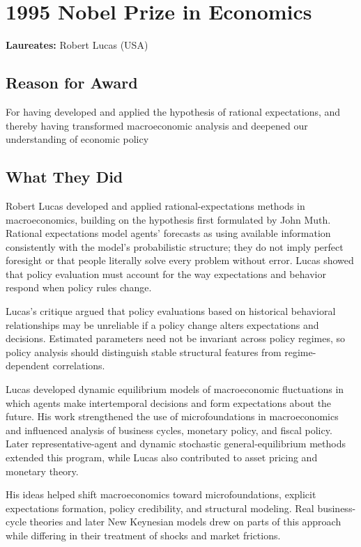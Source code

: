 \chapter{1995 Nobel Prize in Economics}
\textbf{Laureates: }Robert Lucas (USA)

\section*{Reason for Award}
For having developed and applied the hypothesis of rational expectations, and
thereby having transformed macroeconomic analysis and deepened our understanding
of economic policy

\section{What They Did}
Robert Lucas developed and applied rational-expectations methods in
macroeconomics, building on the hypothesis first formulated by John Muth.
Rational expectations model agents' forecasts as using available information
consistently with the model's probabilistic structure; they do not imply
perfect foresight or that people literally solve every problem without error.
Lucas showed that policy evaluation must account for the way expectations and
behavior respond when policy rules change.

Lucas's critique argued that policy evaluations based on historical behavioral
relationships may be unreliable if a policy change alters expectations and
decisions. Estimated parameters need not be invariant across policy regimes,
so policy analysis should distinguish stable structural features from
regime-dependent correlations.

Lucas developed dynamic equilibrium models of macroeconomic fluctuations in
which agents make intertemporal decisions and form expectations about the
future. His work strengthened the use of microfoundations in macroeconomics and
influenced analysis of business cycles, monetary policy, and fiscal policy.
Later representative-agent and dynamic stochastic general-equilibrium methods
extended this program, while Lucas also contributed to asset pricing and
monetary theory.

His ideas helped shift macroeconomics toward microfoundations, explicit
expectations formation, policy credibility, and structural modeling. Real
business-cycle theories and later New Keynesian models drew on parts of this
approach while differing in their treatment of shocks and market frictions.

